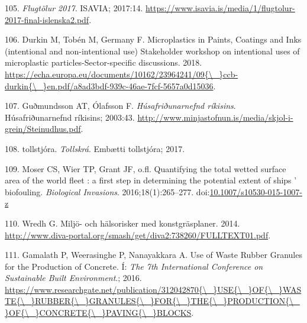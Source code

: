\documentclass[icelandic,]{book}
\begin{document}
\leavevmode\hypertarget{ref-isavia2017}{}%
105. \emph{Flugtölur 2017}. ISAVIA; 2017:14. \url{https://www.isavia.is/media/1/flugtolur-2017-final-islenska2.pdf}.

\leavevmode\hypertarget{ref-Durkin2018}{}%
106. Durkin M, Tobén M, Germany F. Microplastics in Paints, Coatings and Inks (intentional and non-intentional use) Stakeholder workshop on intentional uses of microplastic particles-Sector-specific discussions. 2018. \href{https://echa.europa.eu/documents/10162/23964241/09\%7B/_\%7Dccb-durkin\%7B/_\%7Den.pdf/a8ad3bdf-939c-46ae-7fcf-5657a0d15036}{https://echa.europa.eu/documents/10162/23964241/09\{\textbackslash{}\_\}ccb-durkin\{\textbackslash{}\_\}en.pdf/a8ad3bdf-939c-46ae-7fcf-5657a0d15036}.

\leavevmode\hypertarget{ref-Guuxf0mundsson2003}{}%
107. Guðmundsson AT, Ólafsson F. \emph{Húsafriðunarnefnd ríkisins}. Húsafriðunarnefnd ríkisins; 2003:43. \url{http://www.minjastofnun.is/media/skjol-i-grein/Steinudhus.pdf}.

\leavevmode\hypertarget{ref-tollur2017}{}%
108. tollstjóra. \emph{Tollskrá}. Embætti tollstjóra; 2017.

\leavevmode\hypertarget{ref-Moser2016}{}%
109. Moser CS, Wier TP, Grant JF, o.fl. Quantifying the total wetted surface area of the world fleet : a first step in determining the potential extent of ships ' biofouling. \emph{Biological Invasions}. 2016;18(1):265--277. doi:\href{https://doi.org/10.1007/s10530-015-1007-z}{10.1007/s10530-015-1007-z}

\leavevmode\hypertarget{ref-Wredh2014}{}%
110. Wredh G. Miljö- och hälsorisker med konstgräsplaner. 2014. \url{http://www.diva-portal.org/smash/get/diva2:738260/FULLTEXT01.pdf}.

\leavevmode\hypertarget{ref-Gamalath2016}{}%
111. Gamalath P, Weerasinghe P, Nanayakkara A. Use of Waste Rubber Granules for the Production of Concrete. Í: \emph{The 7th International Conference on Sustainable Built Environment}.; 2016. \href{https://www.researchgate.net/publication/312042870\%7B/_\%7DUSE\%7B/_\%7DOF\%7B/_\%7DWASTE\%7B/_\%7DRUBBER\%7B/_\%7DGRANULES\%7B/_\%7DFOR\%7B/_\%7DTHE\%7B/_\%7DPRODUCTION\%7B/_\%7DOF\%7B/_\%7DCONCRETE\%7B/_\%7DPAVING\%7B/_\%7DBLOCKS}{https://www.researchgate.net/publication/312042870\{\textbackslash{}\_\}USE\{\textbackslash{}\_\}OF\{\textbackslash{}\_\}WASTE\{\textbackslash{}\_\}RUBBER\{\textbackslash{}\_\}GRANULES\{\textbackslash{}\_\}FOR\{\textbackslash{}\_\}THE\{\textbackslash{}\_\}PRODUCTION\{\textbackslash{}\_\}OF\{\textbackslash{}\_\}CONCRETE\{\textbackslash{}\_\}PAVING\{\textbackslash{}\_\}BLOCKS}.
\end{document}

